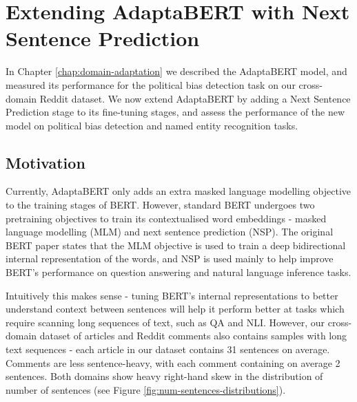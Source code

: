 \chapter{Extending AdaptaBERT with Next Sentence Prediction} \label{chap:extending-adaptabert}

In Chapter \ref{chap:domain-adaptation} we described the AdaptaBERT model, and measured its performance for the political bias detection task on our cross-domain Reddit dataset. We now extend AdaptaBERT by adding a Next Sentence Prediction stage to its fine-tuning stages, and assess the performance of the new model on political bias detection and named entity recognition tasks.

\section{Motivation}

Currently, AdaptaBERT only adds an extra masked language modelling objective to the training stages of BERT. However, standard BERT undergoes two pretraining objectives to train its contextualised word embeddings - masked language modelling (MLM) and next sentence prediction (NSP). The original BERT paper \cite{bert} states that the MLM objective is used to train a deep bidirectional internal representation of the words, and NSP is used mainly to help improve BERT's performance on question answering and natural language inference tasks.

Intuitively this makes sense - tuning BERT's internal representations to better understand context between sentences will help it perform better at tasks which require scanning long sequences of text, such as QA and NLI. However, our cross-domain dataset of articles and Reddit comments also contains samples with long text sequences - each article in our dataset contains 31 sentences on average. Comments are less sentence-heavy, with each comment containing on average 2 sentences. Both domains show heavy right-hand skew in the distribution of number of sentences (see Figure \ref{fig:num-sentences-distributions}).

